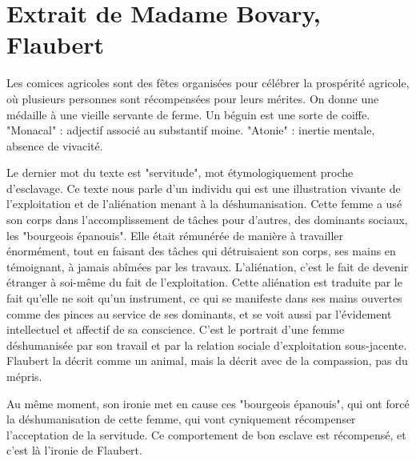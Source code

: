 \documentclass[a4paper,12pt]{book}
\begin{document}
\section{Extrait de Madame Bovary, Flaubert}
Les comices agricoles sont des fêtes organisées pour célébrer la prospérité agricole, où plusieurs personnes sont récompensées pour leurs mérites. On donne une médaille à une vieille servante de ferme. Un béguin est une sorte de coiffe. "Monacal" : adjectif associé au substantif moine. "Atonie" : inertie mentale, absence de vivacité. 
\par Le dernier mot du texte est "servitude", mot étymologiquement proche d'esclavage. Ce texte nous parle d'un individu qui est une illustration vivante de l'exploitation et de l'aliénation menant à la déshumanisation. Cette femme a usé son corps dans l'accomplissement de tâches pour d'autres, des dominants sociaux, les "bourgeois épanouis". Elle était rémunérée de manière à travailler énormément, tout en faisant des tâches qui détruisaient son corps, ses mains en témoignant, à jamais abîmées par les travaux. L'aliénation, c'est le fait de devenir étranger à soi-même du fait de l'exploitation. Cette aliénation est traduite par le fait qu'elle ne soit qu'un instrument, ce qui se manifeste dans ses mains ouvertes comme des pinces au service de ses dominants, et se voit aussi par l'évidement intellectuel et affectif de sa conscience. C'est le portrait d'une femme déshumanisée par son travail et par la relation sociale d'exploitation sous-jacente. Flaubert la décrit comme un animal, mais la décrit avec de la compassion, pas du mépris.
\par Au même moment, son ironie met en cause ces "bourgeois épanouis", qui ont forcé la déshumanisation de cette femme, qui vont cyniquement récompenser l'acceptation de la servitude. Ce comportement de bon esclave est récompensé, et c'est là l'ironie de Flaubert.
\end{document}
